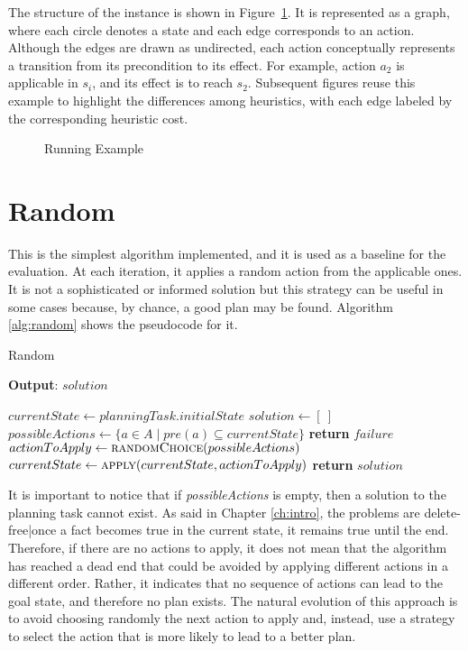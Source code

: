 The structure of the instance is shown in Figure~\ref{fig:running_example}.
It is represented as a graph, where each circle denotes a state and each edge corresponds to an action.
Although the edges are drawn as undirected, each action conceptually represents a transition from its precondition to its effect.
For example, action $a_2$ is applicable in $s_i$, and its effect is to reach $s_2$.
Subsequent figures reuse this example to highlight the differences among heuristics,
with each edge labeled by the corresponding heuristic cost.

\begin{figure}[ht]
	\centering
	\def\svgwidth{0.75\linewidth}
	
	\caption{Running Example}
	\label{fig:running_example}
\end{figure}

\section{Random}
This is the simplest algorithm implemented, and it is used as a baseline for the evaluation.
At each iteration, it applies a random action from the applicable ones.
It is not a sophisticated or informed solution but this strategy can be useful
in some cases because, by chance, a good plan may be found.
Algorithm \ref{alg:random} shows the pseudocode for it.

\begin{algorithm}
	\caption{Random}
	\label{alg:random}
	\hspace*{0.5em} \textbf{Output}: $solution$
	\begin{algorithmic}[1]
		\State $currentState \gets planningTask.initialState$
		\State $solution \gets [\ ]$ 
		\State $possibleActions \gets \{a \in A \mid pre(a) \subseteq currentState\}$
		\State \textbf{return} $failure$ 
		\EndIf
		\State $actionToApply \gets \Call{randomChoice}{possibleActions}$
		\State $currentState \gets \Call{apply}{currentState, actionToApply}$
		\State {}
		\EndWhile
		\State \textbf{return} $solution$
		\EndProcedure
	\end{algorithmic}
\end{algorithm}

It is important to notice that if \textit{possibleActions} is empty, then
a solution to the planning task cannot exist. As said in Chapter \ref{ch:intro},
the problems are delete-free|once a fact becomes true in the current state, it remains
true until the end.
Therefore, if there are no actions to apply, it does not mean that the algorithm has reached
a dead end that could be avoided by applying different actions in a different order.
Rather, it indicates that no sequence of actions can lead to the goal state, and therefore no plan exists.
The natural evolution of this approach is to avoid choosing randomly the next action to apply and, instead, use
a strategy to select the action that is more likely to lead to a better plan.

